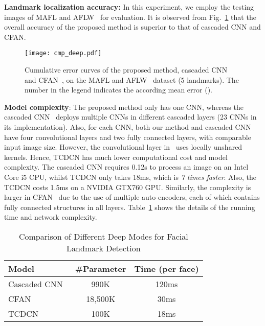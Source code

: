 \documentclass[10pt,journal,compsoc]{IEEEtran}
\begin{document}
\noindent\textbf{Landmark localization accuracy:}
In this experiment, we employ the testing images of MAFL and AFLW~\cite{Kostinger2011} for evaluation. It is observed from Fig.~\ref{fig:cmp_deep} that the overall accuracy of the proposed method is superior to that of cascaded CNN and CFAN.
\begin{figure}[t]
  \centering
  \texttt{[image: cmp\_deep.pdf]}
  \vskip -0.3cm
  \caption{Cumulative error curves of the proposed method, cascaded CNN~\cite{Sun2013} and CFAN~\cite{zhang2014coarse}, on the MAFL and AFLW~\cite{Kostinger2011} dataset (5 landmarks). The number in the legend indicates the according mean error ().}
  \label{fig:cmp_deep}
\end{figure}

\vspace{0.1cm}
\noindent\textbf{Model complexity}:
The proposed method only has one CNN, whereas the cascaded CNN~\cite{Sun2013} deploys multiple CNNs in different cascaded layers (23 CNNs in its implementation). Also, for each CNN, both our method and cascaded CNN~\cite{Sun2013} have four convolutional layers and two fully connected layers, with comparable input image size. However, the convolutional layer in~\cite{Sun2013} uses locally unshared kernels. Hence, TCDCN has much lower computational cost and model complexity. The cascaded CNN requires 0.12s to process an image on an Intel Core i5 CPU, whilst TCDCN only takes 18ms, which is \textit{7 times faster}. Also, the TCDCN costs 1.5ms on a NVIDIA GTX760 GPU. Similarly, the complexity is larger in CFAN~\cite{zhang2014coarse} due to the use of multiple auto-encoders, each of which contains fully connected structures in all layers. Table~\ref{tab:complexity} shows the details of the running time and network complexity.

\begin{table}[t]
\caption{Comparison of Different Deep Modes for Facial Landmark Detection}
\label{tab:complexity}
\vskip -0.75cm
\begin{center}
\begin{tabular}{l|c|c}
\hline
Model&\#Parameter&Time (per face)\\
\hline\hline
Cascaded CNN~\cite{Sun2013}&990K&120ms\\
CFAN~\cite{zhang2014coarse}&18,500K&30ms\\
TCDCN&100K&18ms\\

\hline
\end{tabular}
\end{center}
\vskip -0.4cm
\end{table}
\end{document}
